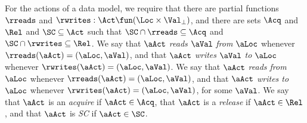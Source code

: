 For the actions of a data model, we require that
  there are partial functions $\rreads$ and
  $\rwrites: \Act \fun (\Loc \times \Val_\bot)$, and
  there are sets $\Acq$ and $\Rel$ and $\SC \subseteq\Act$ such that
  $\SC\cap\rreads\subseteq\Acq$ and
  $\SC\cap\rwrites\subseteq\Rel$. %
%
We say that $\aAct$ \emph{reads} $\aVal$ \emph{from} $\aLoc$ whenever
$\rreads(\aAct) = (\aLoc,\aVal)$, and that $\aAct$ \emph{writes} $\aVal$
\emph{to} $\aLoc$ whenever $\rwrites(\aAct) = (\aLoc,\aVal)$.
We say that $\aAct$ \emph{reads from} $\aLoc$ whenever
$\rreads(\aAct) = (\aLoc,\aVal)$, and that $\aAct$ \emph{writes to}
$\aLoc$ whenever $\rwrites(\aAct) = (\aLoc,\aVal)$, for some $\aVal$. %
%
%
We say that $\aAct$ is an \emph{acquire} if $\aAct\in\Acq$, that $\aAct$
is a \emph{release} if $\aAct\in\Rel$, and that $\aAct$ is \emph{SC} if $\aAct\in\SC$.  


